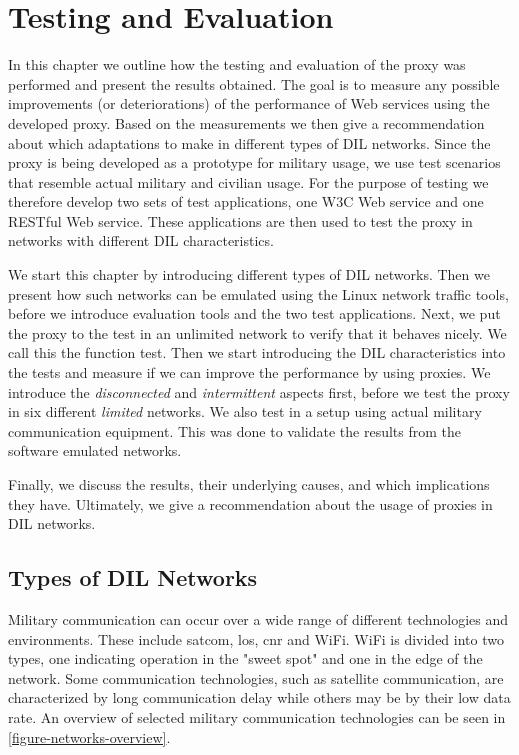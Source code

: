 \chapter{Testing and Evaluation}

\label{chapter:evaluation}

In this chapter we outline how the testing and evaluation of the proxy was
performed and present the results obtained. The goal is to measure any possible
improvements (or deteriorations) of the performance of Web services using the
developed proxy. Based on the measurements we then give a recommendation about
which adaptations to make in different types of DIL networks. Since the proxy is
being developed as a prototype for military usage, we use test scenarios that
resemble actual military and civilian usage. For the purpose of testing we
therefore develop two sets of test applications, one W3C Web service and one
RESTful Web service. These applications are then used to test the proxy in
networks with different DIL characteristics.

We start this chapter by introducing different types of DIL networks. Then we
present how such networks can be emulated using the Linux network traffic tools,
before we introduce evaluation tools and the two test applications. Next, we put
the proxy to the test in an unlimited network to verify that it behaves nicely.
We call this the function test. Then we start introducing the DIL
characteristics into the tests and measure if we can improve the performance by
using proxies. We introduce the \textit{disconnected} and \textit{intermittent}
aspects first, before we test the proxy in six different \textit{limited}
networks. We also test in a setup using actual military communication equipment.
This was done to validate the results from the software emulated networks.

Finally, we discuss the results, their underlying causes, and which implications
they have. Ultimately, we give a recommendation about the usage of proxies in
DIL networks.

\section{Types of DIL Networks}

Military communication can occur over a wide range of different technologies and
environments. These include \gls{satcom}, \gls{los}, \gls{cnr} and WiFi. WiFi is
divided into two types, one indicating operation in the "sweet spot" and one in
the edge of the network. Some communication technologies, such as satellite
communication, are characterized by long communication delay while others may be
by their low data rate. An overview of selected military communication
technologies can be seen in \cref{figure-networks-overview}.


